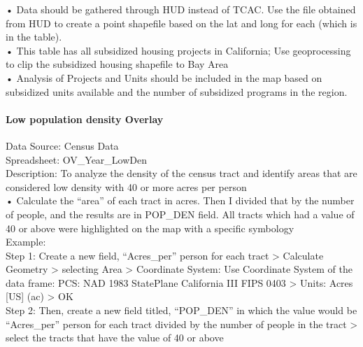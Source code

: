 \documentclass[]{article}
\let\oldparagraph\paragraph
\renewcommand{\paragraph}[1]{\oldparagraph{#1}\mbox{}}
\begin{document}
• Data should be gathered through HUD instead of TCAC. Use the file
obtained from HUD to create a point shapefile based on the lat and long
for each (which is in the table).\\
• This table has all subsidized housing projects in California; Use
geoprocessing to clip the subsidized housing shapefile to Bay Area\\
• Analysis of Projects and Units should be included in the map based on
subsidized units available and the number of subsidized programs in the
region.

\paragraph{Low population density
Overlay}\label{low-population-density-overlay}

Data Source: Census Data\\
Spreadsheet: OV\_Year\_LowDen\\
Description: To analyze the density of the census tract and identify
areas that are considered low density with 40 or more acres per person\\
• Calculate the ``area'' of each tract in acres. Then I divided that by
the number of people, and the results are in POP\_DEN field. All tracts
which had a value of 40 or above were highlighted on the map with a
specific symbology\\
Example:\\
Step 1: Create a new field, ``Acres\_per'' person for each tract
\textgreater{} Calculate Geometry \textgreater{} selecting Area
\textgreater{} Coordinate System: Use Coordinate System of the data
frame: PCS: NAD 1983 StatePlane California III FIPS 0403 \textgreater{}
Units: Acres {[}US{]} (ac) \textgreater{} OK\\
Step 2: Then, create a new field titled, ``POP\_DEN'' in which the value
would be ``Acres\_per'' person for each tract divided by the number of
people in the tract \textgreater{} select the tracts that have the value
of 40 or above
\end{document}
